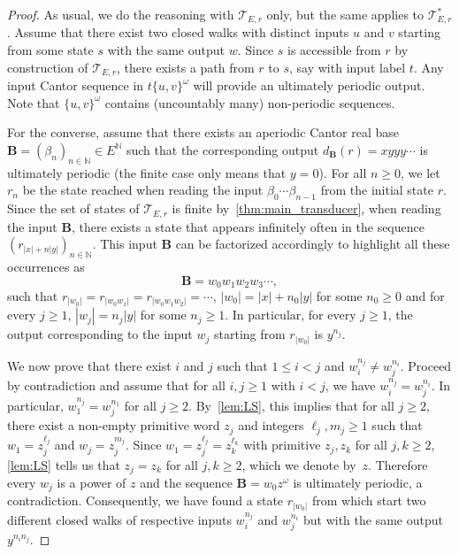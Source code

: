 \documentclass[12pt,reqno]{amsart}
\newcommand{\B}{{\mathbf{B}}}
\begin{document}
\begin{proof}
As usual, we do the reasoning with $\mathcal{T}_{E,r}$ only, but the same applies to $\mathcal{T}^*_{E,r}$. Assume that there exist two closed walks with distinct inputs $u$ and $v$ starting from some state $s$ with the same output $w$. Since $s$ is accessible from $r$ by construction of $\mathcal{T}_{E,r}$, there exists a path from $r$ to $s$, say with input label $t$. Any input Cantor sequence in $t\{u,v\}^{\omega}$ will provide an ultimately periodic output. Note that $\{u,v\}^{\omega}$ contains (uncountably many) non-periodic sequences.

For the converse, assume that there exists an aperiodic Cantor real base $\B=(\beta_n)_{n\in\mathbb{N}} \in E^{\mathbb{N}}$ such that the corresponding output $d_\B(r)=xyyy\cdots$ is ultimately periodic (the finite case only means that $y=0$). For all $n\ge 0$, we let $r_n$ be the state reached when reading the input $\beta_0\cdots \beta_{n-1}$ from the initial state $r$. 
Since the set of states of $\mathcal{T}_{E,r}$ is finite by~\cref{thm:main_transducer}, when reading the input $\B$, there exists a state that appears infinitely often in the sequence $(r_{|x|+n|y|})_{n\in\mathbb{N}}$. This input $\B$ can be factorized accordingly to highlight all these occurrences as 
\[\B=w_0w_1w_2w_3\cdots,\] 
such that $r_{|w_0|}=r_{|w_0w_1|}=r_{|w_0w_1w_2|}=\cdots$, $|w_0|=|x|+n_0 |y|$ for some $n_0\ge 0$ and for every $j\ge 1$, $|w_j|=n_j|y|$ for some $n_j\ge 1$. In particular, for every $j\ge 1$, the output corresponding to the input $w_j$ starting from $r_{|w_0|}$ is $y^{n_j}$.

We now prove that there exist $i$ and $j$ such that $1\le i<j$ and $w_i^{n_j}\ne w_j^{n_i}$. Proceed by contradiction and assume that for all $i,j\ge 1$ with $i<j$, we have $w_i^{n_j}=w_j^{n_i}$. In particular, $w_1^{n_j}=w_j^{n_1}$ for all $j\ge 2$. By~\cref{lem:LS}, this implies that for all $j\ge 2$, there exist a non-empty primitive word $z_j$ and integers $\ell_j,m_j\ge 1$ such that $w_1=z_j^{\ell_j}$ and $w_j=z_j^{m_j}$. Since $w_1=z_j^{\ell_j}=z_k^{\ell_k}$ with primitive $z_j,z_k$ for all $j,k\ge 2$, \cref{lem:LS} tells us that $z_j=z_k$ for all $j,k\ge 2$, which we denote by~$z$. Therefore every $w_j$ is a power of $z$ and the sequence $\B=w_0z^{\omega}$ is ultimately periodic, a contradiction. Consequently, we have found a state $r_{|w_0|}$ from which start two different closed walks of respective inputs $w_i^{n_j}$ and $w_j^{n_i}$ but with the same output $y^{n_in_j}$. 
\end{proof}
\end{document}
